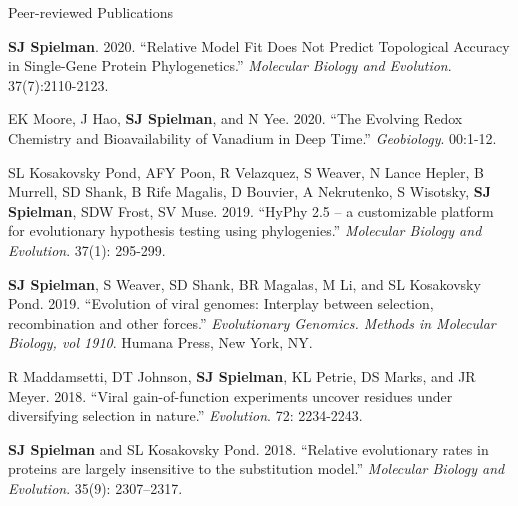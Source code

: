 \documentclass{resume} %
\begin{document}
\vspace*{0.35cm}
\begin{rSection}{Peer-reviewed Publications}
\vspace*{0.25cm}

\begin{etaremune}[leftmargin=1.5em]

\item \textbf{SJ Spielman}. 2020. ``Relative Model Fit Does Not Predict Topological Accuracy in Single-Gene Protein Phylogenetics.'' \emph{Molecular Biology and Evolution}. 37(7):2110-2123.

\item EK Moore, J Hao, \textbf{SJ Spielman}, and N Yee. 2020. ``The Evolving Redox Chemistry and Bioavailability of Vanadium in Deep Time.'' \emph{Geobiology}. 00:1-12.

\item SL Kosakovsky Pond, AFY Poon, R Velazquez, S Weaver, N Lance Hepler, B Murrell, SD Shank, B Rife Magalis, D Bouvier, A Nekrutenko, S Wisotsky, \textbf{SJ Spielman}, SDW Frost, SV Muse. 2019. ``HyPhy 2.5 – a customizable platform for evolutionary hypothesis testing using phylogenies.'' \emph{Molecular Biology and Evolution}. 37(1): 295-299.

\item \textbf{SJ Spielman}, S Weaver, SD Shank, BR Magalas, M Li, and SL Kosakovsky Pond. 2019. ``Evolution of viral genomes: Interplay between selection, recombination and other forces.'' \emph{Evolutionary Genomics. Methods in Molecular Biology, vol 1910}. Humana Press, New York, NY.

\item R Maddamsetti, DT Johnson, \textbf{SJ Spielman}, KL Petrie, DS Marks, and JR Meyer. 2018. ``Viral gain-of-function experiments uncover residues under diversifying selection in nature.'' \emph{Evolution}. 72: 2234-2243.

\item \textbf{SJ Spielman} and SL Kosakovsky Pond. 2018. ``Relative evolutionary rates in proteins are largely insensitive to the substitution model.'' \emph{Molecular Biology and Evolution}. 35(9): 2307–2317.


\end{etaremune}
\end{rSection}
\end{document}
